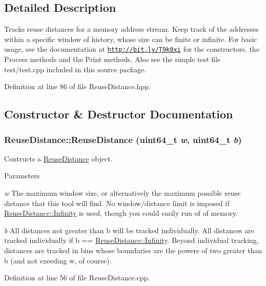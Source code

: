 \subsection{Detailed Description}
Tracks reuse distances for a memory address stream. Keep track of the addresses within a specific window of history, whose size can be finite or infinite. For basic usage, see the documentation at \href{http://bit.ly/T9k0xi}{\tt http://bit.ly/T9k0xi} for the constructors, the Process methods and the Print methods. Also see the simple test file test/test.cpp included in this source package. 

Definition at line 86 of file ReuseDistance.hpp.



\subsection{Constructor \& Destructor Documentation}
\hypertarget{class_reuse_distance_a0248afa697da0f6c87c6fd30c289ecc6}{
\subsubsection[{ReuseDistance}]{\setlength{\rightskip}{0pt plus 5cm}ReuseDistance::ReuseDistance (uint64\_\-t {\em w}, \/  uint64\_\-t {\em b})}}
\label{class_reuse_distance_a0248afa697da0f6c87c6fd30c289ecc6}
Contructs a \hyperlink{class_reuse_distance}{ReuseDistance} object.


\begin{DoxyParams}{Parameters}
\item[{\em w}]The maximum window size, or alternatively the maximum possible reuse distance that this tool will find. No window/distance limit is imposed if \hyperlink{class_reuse_distance_a59f7f0ac6ad014472537619394ac7375}{ReuseDistance::Infinity} is used, though you could easily run of of memory. \item[{\em b}]All distances not greater than b will be tracked individually. All distances are tracked individually if b == \hyperlink{class_reuse_distance_a59f7f0ac6ad014472537619394ac7375}{ReuseDistance::Infinity}. Beyond individual tracking, distances are tracked in bins whose boundaries are the powers of two greater than b (and not exeeding w, of course). \end{DoxyParams}


Definition at line 56 of file ReuseDistance.cpp.

